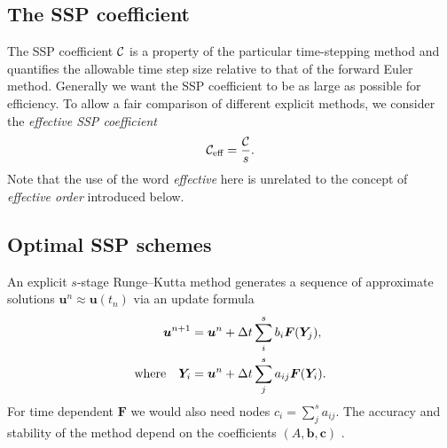 \subsection{The SSP coefficient}

The SSP coefficient $\mathcal{C}$ is a property of the particular time-stepping method and quantifies the allowable time step size relative to that of the forward Euler method.
Generally we want the SSP coefficient to be as large as possible for efficiency.
To allow a fair comparison of different explicit methods, we consider the \emph{effective SSP coefficient}
$$\mathcal{C}_{\text{eff}} = \frac{\mathcal{C}}{s}.$$
Note that the use of the word \emph{effective} here is unrelated to the concept of \emph{effective order} introduced below.


\subsection{Optimal SSP schemes \label{subsec:Optimal_SSPRK}}


An explicit $s$-stage Runge--Kutta method generates a sequence of approximate solutions $\bm{u}^n \approx \bm{u}(t_n)$ via an update formula
\begin{align*}
\bm{u}^{n+1} &= \bm{u}^{n} + \Delta t \sum_i^s b_i \bm{F}(\bm{Y}_j), \\
\text{where} \quad \bm{Y}_{i} &= \bm{u}^{n} + \Delta t \sum_j^s a_{ij} \bm{F}(\bm{Y}_i).
\end{align*}
For time dependent $\bm{F}$ we would also need nodes $c_i =
\sum_j^sa_{ij}$.
The accuracy and stability of the method depend on the coefficients $(A,\bm{b},\bm{c})$
\cite{Butcher2008_book}.


